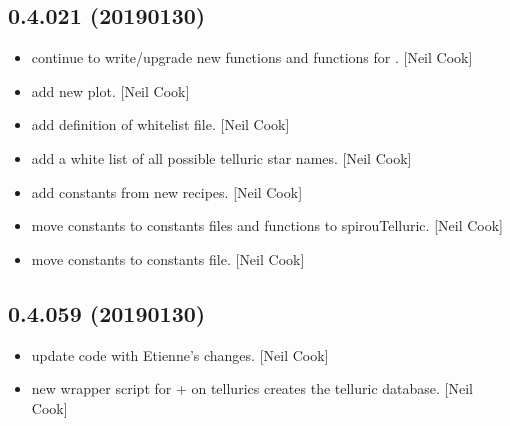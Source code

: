 \documentclass[a4paper,10pt,english]{report}
\begin{document}
\subsection{0.4.021 (2019\sphinxhyphen{}01\sphinxhyphen{}30)}
\label{\detokenize{misc/changelog:id220}}\begin{itemize}
\item {} 
 \sphinxhyphen{} continue to write/upgrade new  functions
and functions for . {[}Neil Cook{]}

\item {} 
 \sphinxhyphen{} add new  plot. {[}Neil Cook{]}

\item {} 
 \sphinxhyphen{} add definition of whitelist file. {[}Neil Cook{]}

\item {} 
 \sphinxhyphen{} add a white list of all possible telluric star
names. {[}Neil Cook{]}

\item {} 
 \sphinxhyphen{} add constants from new recipes. {[}Neil Cook{]}

\item {} 
 \sphinxhyphen{} move constants to constants files and functions
to spirouTelluric. {[}Neil Cook{]}

\item {} 
 \sphinxhyphen{} move constants to constants file. {[}Neil Cook{]}

\end{itemize}


\subsection{0.4.059 (2019\sphinxhyphen{}01\sphinxhyphen{}30)}
\label{\detokenize{misc/changelog:id221}}\begin{itemize}
\item {} 
 \sphinxhyphen{} update code with Etienne’s changes. {[}Neil Cook{]}

\item {} 
 \sphinxhyphen{} new wrapper script for  +  on
tellurics \textendash{} creates the telluric database. {[}Neil Cook{]}

\end{itemize}
\end{document}
